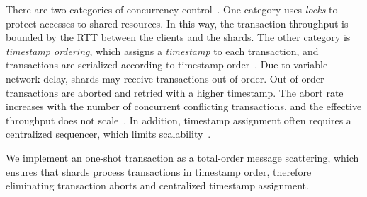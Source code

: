 There are two categories of concurrency control~\cite{bernstein1981concurrency}. One category uses \textit{locks} to protect accesses to shared resources. In this way, the transaction throughput is bounded by the RTT between the clients and the shards. The other category is \textit{timestamp ordering}, which assigns a \textit{timestamp} to each transaction, and transactions are serialized according to timestamp order~\cite{kung1981optimistic,bernstein1983multiversion}. Due to variable network delay, shards may receive transactions out-of-order. Out-of-order transactions are aborted and retried with a higher timestamp. The abort rate increases with the number of concurrent conflicting transactions, and the effective throughput does not scale~\cite{yu2014staring}. In addition, timestamp assignment often requires a centralized sequencer, which limits scalability~\cite{yu2014staring}.

We implement an one-shot transaction as a total-order message scattering, which ensures that shards process transactions in timestamp order, therefore eliminating transaction aborts and centralized timestamp assignment. %




